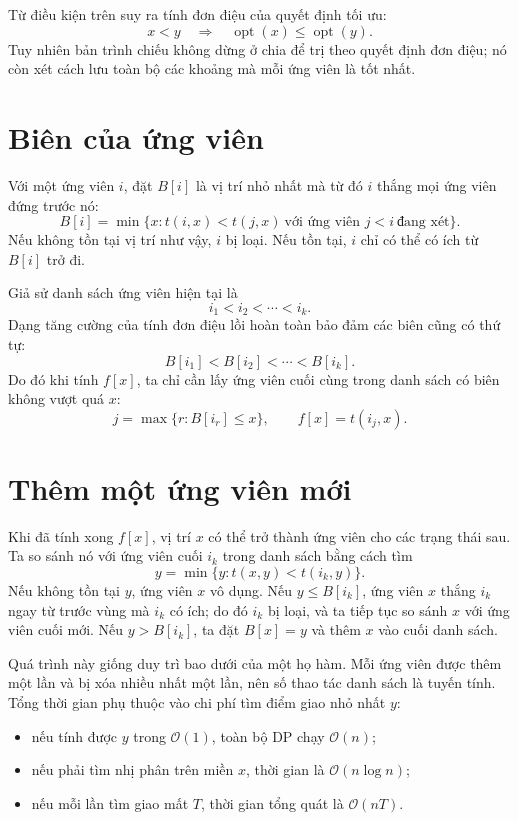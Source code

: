 \documentclass[11pt]{article}
\newcommand{\Oh}{\mathcal{O}}
\newcommand{\opt}{\operatorname{opt}}
\begin{document}
Từ điều kiện trên suy ra tính đơn điệu của quyết định tối ưu:
\[
  x<y \quad\Longrightarrow\quad \opt(x)\le \opt(y).
\]
Tuy nhiên bản trình chiếu không dừng ở chia để trị theo quyết định đơn điệu;
nó còn xét cách lưu toàn bộ các khoảng mà mỗi ứng viên là tốt nhất.

\section{Biên của ứng viên}

Với một ứng viên \(i\), đặt \(B[i]\) là vị trí nhỏ nhất mà từ đó \(i\) thắng
mọi ứng viên đứng trước nó:
\[
  B[i]=\min\{x: t(i,x)<t(j,x)\ \text{với ứng viên }j<i\ \text{đang xét}\}.
\]
Nếu không tồn tại vị trí như vậy, \(i\) bị loại. Nếu tồn tại, \(i\) chỉ có
thể có ích từ \(B[i]\) trở đi.

Giả sử danh sách ứng viên hiện tại là
\[
  i_1<i_2<\cdots<i_k.
\]
Dạng tăng cường của tính đơn điệu lồi hoàn toàn bảo đảm các biên cũng có thứ
tự:
\[
  B[i_1]<B[i_2]<\cdots<B[i_k].
\]
Do đó khi tính \(f[x]\), ta chỉ cần lấy ứng viên cuối cùng trong danh sách có
biên không vượt quá \(x\):
\[
  j=\max\{r: B[i_r]\le x\},\qquad
  f[x]=t(i_j,x).
\]

\section{Thêm một ứng viên mới}

Khi đã tính xong \(f[x]\), vị trí \(x\) có thể trở thành ứng viên cho các
trạng thái sau. Ta so sánh nó với ứng viên cuối \(i_k\) trong danh sách bằng
cách tìm
\[
  y=\min\{y: t(x,y)<t(i_k,y)\}.
\]
Nếu không tồn tại \(y\), ứng viên \(x\) vô dụng. Nếu \(y\le B[i_k]\), ứng
viên \(x\) thắng \(i_k\) ngay từ trước vùng mà \(i_k\) có ích; do đó \(i_k\)
bị loại, và ta tiếp tục so sánh \(x\) với ứng viên cuối mới. Nếu \(y>B[i_k]\),
ta đặt \(B[x]=y\) và thêm \(x\) vào cuối danh sách.

Quá trình này giống duy trì bao dưới của một họ hàm. Mỗi ứng viên được thêm
một lần và bị xóa nhiều nhất một lần, nên số thao tác danh sách là tuyến
tính. Tổng thời gian phụ thuộc vào chi phí tìm điểm giao nhỏ nhất \(y\):
\begin{itemize}
  \item nếu tính được \(y\) trong \(\Oh(1)\), toàn bộ DP chạy \(\Oh(n)\);
  \item nếu phải tìm nhị phân trên miền \(x\), thời gian là \(\Oh(n\log n)\);
  \item nếu mỗi lần tìm giao mất \(T\), thời gian tổng quát là \(\Oh(nT)\).
\end{itemize}
\end{document}
